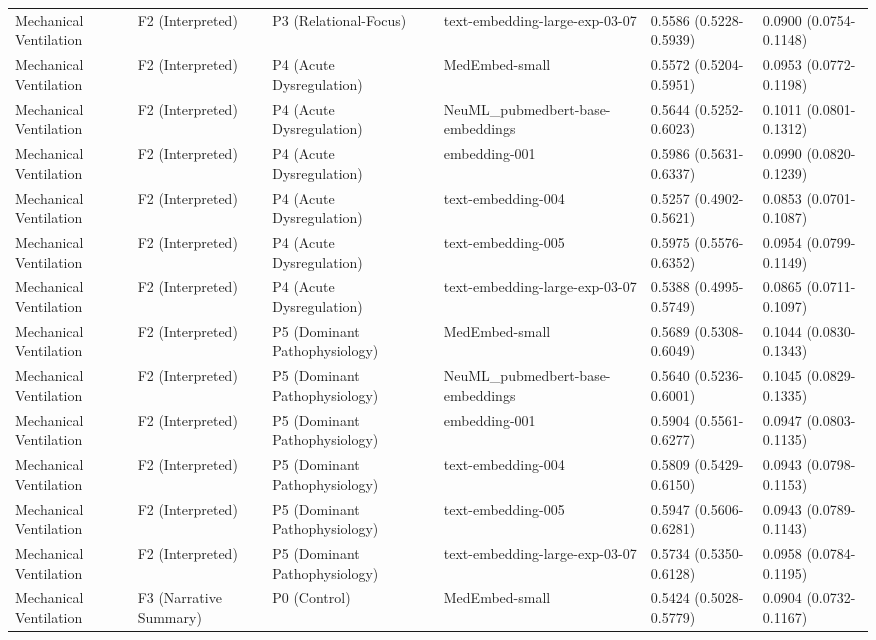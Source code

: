 \begin{tabular}{llllll}
Mechanical Ventilation & F2 (Interpreted) & P3 (Relational-Focus) & text-embedding-large-exp-03-07 & 0.5586 (0.5228-0.5939) & 0.0900 (0.0754-0.1148) \\
Mechanical Ventilation & F2 (Interpreted) & P4 (Acute Dysregulation) & MedEmbed-small & 0.5572 (0.5204-0.5951) & 0.0953 (0.0772-0.1198) \\
Mechanical Ventilation & F2 (Interpreted) & P4 (Acute Dysregulation) & NeuML\_pubmedbert-base-embeddings & 0.5644 (0.5252-0.6023) & 0.1011 (0.0801-0.1312) \\
Mechanical Ventilation & F2 (Interpreted) & P4 (Acute Dysregulation) & embedding-001 & 0.5986 (0.5631-0.6337) & 0.0990 (0.0820-0.1239) \\
Mechanical Ventilation & F2 (Interpreted) & P4 (Acute Dysregulation) & text-embedding-004 & 0.5257 (0.4902-0.5621) & 0.0853 (0.0701-0.1087) \\
Mechanical Ventilation & F2 (Interpreted) & P4 (Acute Dysregulation) & text-embedding-005 & 0.5975 (0.5576-0.6352) & 0.0954 (0.0799-0.1149) \\
Mechanical Ventilation & F2 (Interpreted) & P4 (Acute Dysregulation) & text-embedding-large-exp-03-07 & 0.5388 (0.4995-0.5749) & 0.0865 (0.0711-0.1097) \\
Mechanical Ventilation & F2 (Interpreted) & P5 (Dominant Pathophysiology) & MedEmbed-small & 0.5689 (0.5308-0.6049) & 0.1044 (0.0830-0.1343) \\
Mechanical Ventilation & F2 (Interpreted) & P5 (Dominant Pathophysiology) & NeuML\_pubmedbert-base-embeddings & 0.5640 (0.5236-0.6001) & 0.1045 (0.0829-0.1335) \\
Mechanical Ventilation & F2 (Interpreted) & P5 (Dominant Pathophysiology) & embedding-001 & 0.5904 (0.5561-0.6277) & 0.0947 (0.0803-0.1135) \\
Mechanical Ventilation & F2 (Interpreted) & P5 (Dominant Pathophysiology) & text-embedding-004 & 0.5809 (0.5429-0.6150) & 0.0943 (0.0798-0.1153) \\
Mechanical Ventilation & F2 (Interpreted) & P5 (Dominant Pathophysiology) & text-embedding-005 & 0.5947 (0.5606-0.6281) & 0.0943 (0.0789-0.1143) \\
Mechanical Ventilation & F2 (Interpreted) & P5 (Dominant Pathophysiology) & text-embedding-large-exp-03-07 & 0.5734 (0.5350-0.6128) & 0.0958 (0.0784-0.1195) \\
Mechanical Ventilation & F3 (Narrative Summary) & P0 (Control) & MedEmbed-small & 0.5424 (0.5028-0.5779) & 0.0904 (0.0732-0.1167) \\

\end{tabular}
